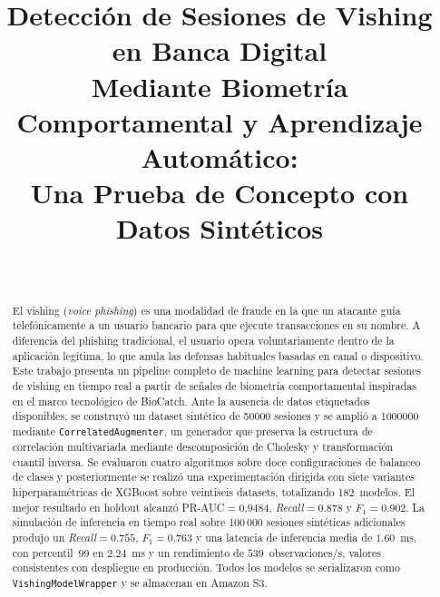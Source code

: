 \documentclass[journal]{IEEEtran}
\newcommand{\wrapcls}{\texttt{VishingModelWrapper}}
\newcommand{\augcls}{\texttt{CorrelatedAugmenter}}
\newcommand{\prauc}{\textsc{PR-AUC}}
\begin{document}
\title{Detección de Sesiones de Vishing en Banca Digital\\
Mediante Biometría Comportamental y Aprendizaje Automático:\\
Una Prueba de Concepto con Datos Sintéticos}

\author{%
  \\
}

\maketitle

\begin{abstract}
El vishing (\textit{voice phishing}) es una modalidad de fraude en la que un
atacante guía telefónicamente a un usuario bancario para que ejecute
transacciones en su nombre. A diferencia del phishing tradicional, el usuario
opera voluntariamente dentro de la aplicación legítima, lo que anula las
defensas habituales basadas en canal o dispositivo. Este trabajo presenta un
pipeline completo de machine learning para detectar sesiones de vishing en
tiempo real a partir de señales de biometría comportamental inspiradas en el
marco tecnológico de BioCatch. Ante la ausencia de datos etiquetados
disponibles, se construyó un dataset sintético de \num{50000} sesiones y se
amplió a \num{1000000} mediante \augcls{}, un generador que preserva la
estructura de correlación multivariada mediante descomposición de Cholesky y
transformación cuantil inversa. Se evaluaron cuatro algoritmos sobre doce
configuraciones de balanceo de clases y posteriormente se realizó una
experimentación dirigida con siete variantes hiperparamétricas de XGBoost
sobre veintiseis datasets, totalizando 182~modelos. El mejor resultado en
holdout alcanzó \prauc{}$=0.9484$, \textit{Recall}$=0.878$ y
$F_1=0.902$. La simulación de inferencia en tiempo real sobre 100\,000
sesiones sintéticas adicionales produjo un \textit{Recall}$=0.755$,
$F_1=0.763$ y una latencia de inferencia media de $1.60$~ms, con
percentil~99 en $2.24$~ms y un rendimiento de $539$~observaciones/s,
valores consistentes con despliegue en producción. Todos los modelos se
serializaron como \wrapcls{} y se almacenan en Amazon S3.
\end{abstract}
\end{document}
